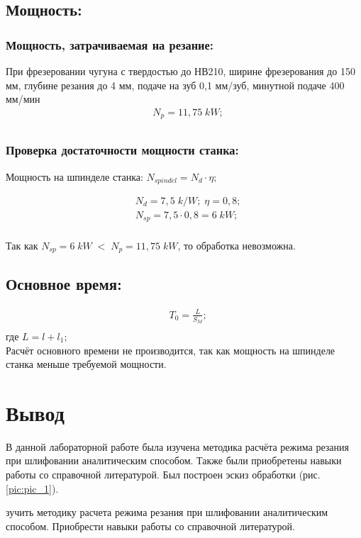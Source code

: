 \subsection{Мощность:}
\subsubsection{Мощность, затрачиваемая на резание:}
При фрезеровании чугуна с твердостью до НВ210, ширине фрезерования до 150 мм, глубине резания до 4 мм, подаче на зуб 0,1 мм/зуб, минутной подаче 400 мм/мин
\begin{equation}
	\begin{split}
		&N_p=11,75\;kW;\\
	\end{split}
\end{equation}

\subsubsection{Проверка достаточности мощности станка:}
Мощность на шпинделе станка: $N_{spindel}=N_d\cdot \eta;$

\begin{equation}
	\begin{split}
		&N_d=7,5\;k/W;\; \eta=0,8;\\
		&N_{sp} = 7,5\cdot 0,8 = 6\;kW;\\
	\end{split}
\end{equation}

Так как $N_{sp}=6 \;kW\; <\; N_p=11,75\;kW$, то обработка невозможна.\\

\subsection{Основное время:}
\begin{equation}
	\begin{split}
		&T_0=\frac{L}{S_M};\\
	\end{split}
\end{equation}
где $L=l+l_1;$\\

Расчёт основного времени не производится, так как мощность на шпинделе станка меньше требуемой мощности.\\

\section{Вывод}
В данной лабораторной работе была изучена методика расчёта режима резания при шлифовании аналитическим способом. Также были приобретены навыки работы со справочной литературой. Был построен эскиз обработки (рис. \ref{pic:pic_1}).


зучить методику расчета режима резания при шлифовании аналитическим способом. Приобрести навыки работы со справочной литературой.